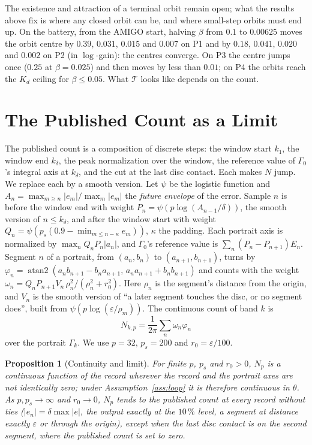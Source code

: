 \documentclass[letterpaper, 10 pt, conference]{ieeeconf}
\newtheorem{proposition}{Proposition}
\begin{document}
The existence and attraction of a terminal orbit remain open; what the
results above fix is where any closed orbit can be, and where small-step
orbits must end up. On the battery, from the AMIGO start, halving $\beta$ from
$0.1$ to $0.00625$ moves the orbit centre by $0.39$, $0.031$, $0.015$ and
$0.007$ on P1 and by $0.18$, $0.041$, $0.020$ and $0.002$ on P2 (in
$\log$-gain): the centres converge. On P3 the centre jumps once ($0.25$ at
$\beta = 0.025$) and then moves by less than $0.01$; on P4 the orbits reach the
$K_d$ ceiling for $\beta \le 0.05$. What $\mathcal{T}$ looks like depends on
the count.

\section{The Published Count as a Limit}
\label{sec:count}

The published count is a composition of discrete steps: the window start
$k_1$, the window end $k_\delta$, the peak normalization over the window,
the reference value of $\Gamma_0$'s integral axis at $k_\delta$, and the cut
at the last disc contact. Each makes $N$ jump. We replace each by a smooth
version. Let $\psi$ be the logistic function and
$A_n = \max_{m \ge n} |e_m| / \max_m |e_m|$ the \emph{future envelope} of the
error. Sample $n$ is before the window end with weight
$P_n = \psi(p \log(A_{n-1}/\delta))$, the smooth version of $n \le k_\delta$,
and after the window start with weight
$Q_n = \psi(p_s (0.9 - \min_{m \le n - \kappa} e_m))$, $\kappa$ the padding.
Each portrait axis is normalized by $\max_n Q_n P_n |a_n|$, and $\Gamma_0$'s
reference value is $\sum_n (P_n - P_{n+1}) E_n$. Segment $n$ of a portrait,
from $(a_n, b_n)$ to $(a_{n+1}, b_{n+1})$, turns by
$\varphi_n = \operatorname{atan2}(a_n b_{n+1} - b_n a_{n+1},\,
a_n a_{n+1} + b_n b_{n+1})$ and counts with the weight
$\omega_n = Q_n P_{n+1} V_n\, \rho_n^2/(\rho_n^2 + r_0^2)$. Here $\rho_n$ is
the segment's distance from the origin, and $V_n$ is the smooth version of
``a later segment touches the disc, or no segment does'', built from
$\psi(p \log(\varepsilon/\rho_m))$. The continuous count of band $k$ is
\begin{equation}
N_{k,p} = \frac{1}{2\pi} \sum_n \omega_n \varphi_n
\label{eq:smooth}
\end{equation}
over the portrait $\Gamma_k$. We use $p = 32$, $p_s = 200$ and
$r_0 = \varepsilon/100$.

\begin{proposition}[Continuity and limit]\label{prop:smooth}
For finite $p$, $p_s$ and $r_0 > 0$, $N_p$ is a continuous function of the
record wherever the record and the portrait axes are not identically zero;
under Assumption~\ref{ass:loop} it is therefore continuous in $\theta$. As
$p, p_s \to \infty$ and $r_0 \to 0$, $N_p$ tends to the published count at
every record without ties ($|e_n| = \delta \max|e|$, the output exactly at the
$10\,\%$ level, a segment at distance exactly $\varepsilon$ or through the
origin), except when the last disc contact is on the second segment, where
the published count is set to zero.
\end{proposition}
\end{document}
